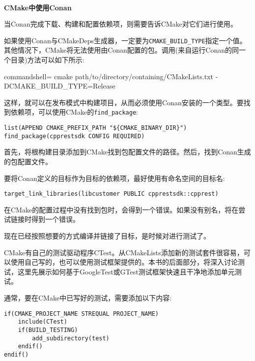 \hspace*{\fill} \\ %
\noindent
\textbf{CMake中使用Conan}

当Conan完成下载、构建和配置依赖项，则需要告诉CMake对它们进行使用。

如果使用Conan与CMakeDeps生成器，一定要为\texttt{CMAKE\_BUILD\_TYPE}指定一个值。其他情况下，CMake将无法使用由Conan配置的包。调用(来自运行Conan的同一个目录)方法可以如下所示:

\begin{tcblisting}{commandshell={}}
cmake path/to/directory/containing/CMakeLists.txt -DCMAKE_BUILD_TYPE=Release
\end{tcblisting}

这样，就可以在发布模式中构建项目，从而必须使用Conan安装的一个类型。要找到依赖项，可以使用CMake的\texttt{find\_package}:

\begin{lstlisting}[style=styleCMake]
list(APPEND CMAKE_PREFIX_PATH "${CMAKE_BINARY_DIR}")
find_package(cpprestsdk CONFIG REQUIRED)
\end{lstlisting}

首先，将根构建目录添加到CMake找到包配置文件的路径。然后，找到Conan生成的包配置文件。

要将Conan定义的目标作为目标的依赖项，最好使用有命名空间的目标名:

\begin{lstlisting}[style=styleCMake]
target_link_libraries(libcustomer PUBLIC cpprestsdk::cpprest)
\end{lstlisting}

在CMake的配置过程中没有找到包时，会得到一个错误。如果没有别名，将在尝试链接时得到一个错误。

现在已经按照想要的方式编译并链接了目标，是时候对进行测试了。


CMake有自己的测试驱动程序CTest。从CMakeLists添加新的测试套件很容易，可以使用自己写的，也可以使用测试框架提供的。本书的后面部分，将深入讨论测试，这里先展示如何基于GoogleTest或GTest测试框架快速且干净地添加单元测试。

通常，要在CMake中已写好的测试，需要添加以下内容:

\begin{lstlisting}[style=styleCMake]
if(CMAKE_PROJECT_NAME STREQUAL PROJECT_NAME)
	include(CTest)
	if(BUILD_TESTING)
		add_subdirectory(test)
	endif()
endif()
\end{lstlisting}

